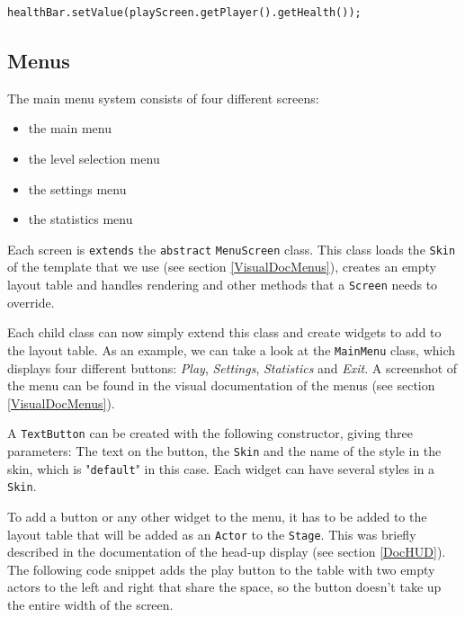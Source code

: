 \documentclass[12p]{article}
\begin{document}
\begin{verbatim}
healthBar.setValue(playScreen.getPlayer().getHealth());
\end{verbatim}


\newpage
\subsection{Menus} \label{DocMenus}

The main menu system consists of four different screens:

\begin{itemize}
  \item the main menu
  \item the level selection menu
  \item the settings menu
  \item the statistics menu
\end{itemize}

Each screen is \texttt{extends} the \texttt{abstract} \texttt{MenuScreen} class. This class loads the \texttt{Skin} of the template that we use (see section \ref{VisualDocMenus}), creates an empty layout table and handles rendering and other methods that a \texttt{Screen} needs to override.

Each child class can now simply extend this class and create widgets to add to the layout table. As an example, we can take a look at the \texttt{MainMenu} class, which displays four different buttons: \emph{Play}, \emph{Settings}, \emph{Statistics} and \emph{Exit}. A screenshot of the menu can be found in the visual documentation of the menus (see section \ref{VisualDocMenus}).

A \texttt{TextButton} can be created with the following constructor, giving three parameters: The text on the button, the \texttt{Skin} and the name of the style in the skin, which is "\texttt{default}" in this case. Each widget can have several styles in a \texttt{Skin}.


To add a button or any other widget to the menu, it has to be added to the layout table that will be added as an \texttt{Actor} to the \texttt{Stage}. This was briefly described in the documentation of the head-up display (see section \ref{DocHUD}). The following code snippet adds the play button to the table with two empty actors to the left and right that share the space, so the button doesn't take up the entire width of the screen.
\end{document}
